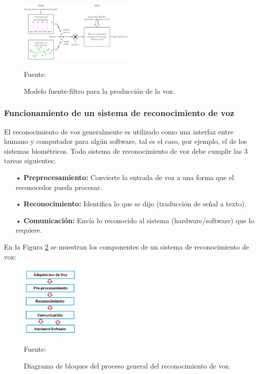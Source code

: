 \begin{figure}[ht]
\begin{center}
\includegraphics[width=0.5\textwidth]{Imagenes/Cap2/image003}
\end{center}
\begin{center}
\vskip -0.5cm
\caption{\small{Modelo fuente-filtro para la producción de la voz.}}
\label{fig:figura2.3}
{\small{Fuente: \cite{rowden}}}
\end{center}
\end{figure}

\subsubsection{Funcionamiento de un sistema de reconocimiento de voz}
El reconocimiento de voz generalmente es utilizado como una interfaz entre humano y computador para algún software, tal es el caso, por ejemplo, el de los sistemas biométricos. Todo sistema de reconocimiento de voz debe cumplir las 3 tareas siguientes:

\begin{enumerate}
\item[•]\textbf{Preprocesamiento:} Convierte la entrada de voz a una forma que el reconocedor pueda procesar.
\item[•]\textbf{Reconocimiento:} Identifica lo que se dijo (traducción de señal a texto).
\item[•]\textbf{Comunicación:} Envía lo reconocido al sistema (hardware/software) que lo requiere.
\end{enumerate}

En la Figura \ref{fig:figura2.4} se muestran los componentes de un sistema de reconocimiento de voz:

\newpage
\begin{figure}[ht]
\begin{center}
\includegraphics[width=0.25\textwidth]{Imagenes/Cap2/image004}
\end{center}
\begin{center}
\vskip -0.5cm
\caption{\small{Diagrama de bloques del proceso general del reconocimiento de voz.}}
\label{fig:figura2.4}
{\small{Fuente: \cite{rama}}}
\end{center}
\end{figure}

